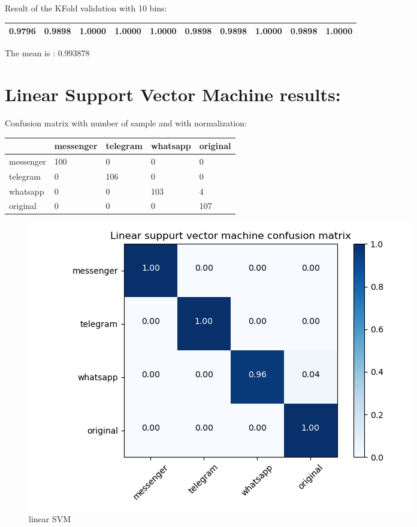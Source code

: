 Result of the KFold validation with 10 bins:
 {\def\arraystretch{1.3} 
 \begin{table}[H] 
\centering 
\begin{tabular}{|l |l |l |l |l |l |l |l |l |l |}  
\hline 
0.9796&
0.9898&
1.0000&
1.0000&
1.0000&
0.9898&
0.9898&
1.0000&
0.9898&
1.0000\\ \hline  

\end{tabular} 
\end{table} }

The mean is : 0.993878\section{Linear Support Vector Machine results:}Confusion matrix with number of sample and with normalization:
 {\def\arraystretch{1.3} 
 \begin{table}[H] 
\centering 
\begin{tabular}{|l|l|l|l|l|} 
\hline 
  &messenger  &telegram  &whatsapp  &original  \\ \hline
messenger  &100  &0  &0  &0  \\ \hline
telegram  &0  &106  &0  &0  \\ \hline
whatsapp  &0  &0  &103  &4  \\ \hline
original  &0  &0  &0  &107  \\ \hline
\end{tabular} 
\end{table} }

 \begin{figure}[H] 
\centering 
\includegraphics[scale=.6]{images/new_met_lsvm_initial.png} 
\caption{linear SVM} 
\end{figure} 


